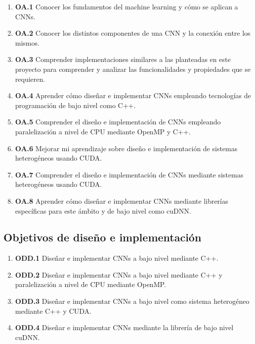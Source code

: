 \begin{enumerate}[label=\textbullet]
	\item \textbf{OA.1} Conocer los fundamentos del machine learning y cómo se aplican a CNNs.
	
	\item \textbf{OA.2} Conocer los distintos componentes de una CNN y la conexión entre los mismos.
	
	\item \textbf{OA.3} Comprender implementaciones similares a las planteadas en este proyecto para comprender y analizar las funcionalidades y propiedades que se requieren. 
	
	\item \textbf{OA.4} Aprender cómo diseñar e implementar CNNs empleando tecnologías de programación de bajo nivel como C++.
	
	\item \textbf{OA.5} Comprender el diseño e implementación de CNNs empleando paralelización a nivel de CPU mediante OpenMP y C++.
	
	\item \textbf{OA.6} Mejorar mi aprendizaje sobre diseño e implementación de sistemas heterogéneos usando CUDA.

	\item \textbf{OA.7} Comprender el diseño e implementación de CNNs mediante sistemas heterogéneos usando CUDA.

	\item \textbf{OA.8} Aprender cómo diseñar e implementar CNNs mediante librerías específicas para este ámbito y de bajo nivel como cuDNN.

\end{enumerate}

\subsection{Objetivos de diseño e implementación}

\begin{enumerate}[label=\textbullet]
	\item \textbf{ODD.1} Diseñar e implementar CNNs a bajo nivel mediante C++.
	
	\item \textbf{ODD.2} Diseñar e implementar CNNs a bajo nivel mediante C++ y paralelización a nivel de CPU mediante OpenMP.

	\item \textbf{ODD.3} Diseñar e implementar CNNs a bajo nivel como sistema heterogéneo mediante C++ y CUDA.

	\item \textbf{ODD.4} Diseñar e implementar CNNs mediante la librería de bajo nivel cuDNN.		
	
\end{enumerate}

